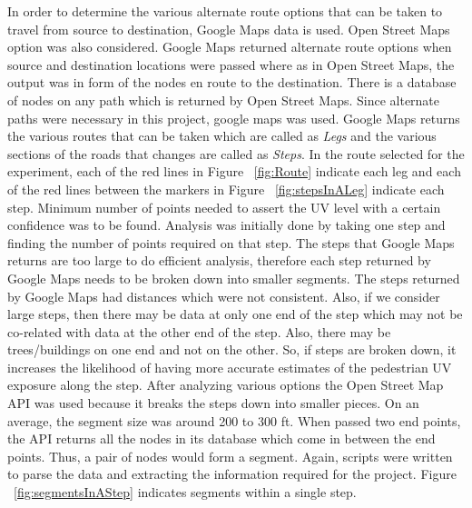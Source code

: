 \documentclass[12pt,fullpage,doublespace]{article}
\begin{document}
In order to determine the various alternate route options that can be taken to travel from source to destination, Google Maps \cite{googleMapsOriginal} data is used. Open Street Maps option was also considered. Google Maps returned alternate route options when source and destination locations were passed where as in Open Street Maps, the output was in form of the nodes en route to the destination. There is a database of nodes on any path which is returned by Open Street Maps. Since alternate paths were necessary in this project, google maps was used. Google Maps returns the various routes that can be taken which are called as {\it Legs} and the various sections of the roads that changes are called as {\it Steps}. In the route selected for the experiment, each of the red lines in Figure ~\ref{fig:Route} indicate each leg and each of the red lines between the markers in Figure ~\ref{fig:stepsInALeg} indicate each step. Minimum number of points needed to assert the UV level with a certain confidence was to be found. Analysis was initially done by taking one step and finding the number of points required on that step. The steps that Google Maps returns are too large to do efficient analysis, therefore each step returned by Google Maps needs to be broken down into smaller segments. The steps returned by Google Maps had distances which were not consistent. Also, if we consider large steps, then there may be data at only one end of the step which may not be co-related with data at the other end of the step. Also, there may be trees/buildings on one end and not on the other. So, if steps are broken down, it increases the likelihood of having more accurate estimates of the pedestrian UV exposure along the step. After analyzing various options the Open Street Map API  \cite{openStreetMapsDirections} was used because it breaks the steps down into smaller pieces. On an average, the segment size was around 200 to 300 ft. When passed two end points, the API returns all the nodes in its database which come in between the end points. Thus, a pair of nodes would form a segment. Again, scripts were written to parse the data and extracting the information required for the project. Figure ~\ref{fig:segmentsInAStep} indicates segments within a single step. 
\end{document}
